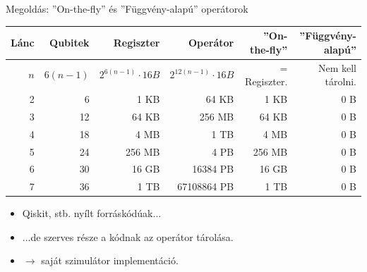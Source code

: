 \documentclass[aspectratio=169]{beamer}
\begin{document}
\begin{frame}[t]{Megoldás: ''On-the-fly'' és ''Függvény-alapú'' operátorok}
\vspace{2mm}
\begin{tabular}{r|r|r|r|r|r}
Lánc & Qubitek & Regiszter & Operátor &  \cellcolor{applegreen!30} ''On-the-fly'' &  \cellcolor{applegreen!30} ''Függvény-alapú'' \\
\hline
\rule{0pt}{1.05\normalbaselineskip} $n$ & $6(n-1)$ & $2^{6(n-1)} \cdot{} 16 B$ & ${2^{12(n-1)}} \cdot{} 16 B$ &  = Regiszter. &   Nem kell tárolni. \\
\hline
2 & 6 &  1 KB &  64 KB &  1 KB & 0 B \\
3 & 12 &  64 KB &  256 MB &  64 KB & 0 B \\
4 & 18 &  4 MB & \color{red} 1 TB &  4 MB & 0 B  \\
5 & 24 &  256 MB & \color{red} 4 PB &  256 MB & 0 B \\
6 & 30 &  16 GB & \color{red} 16384 PB &  16 GB & 0 B\\
7 & 36 & \color{red} 1 TB & \color{red} 67108864 PB & \color{red} 1 TB & 0 B
\end{tabular}
\pause
\vspace{2mm}
\begin{itemize}
    \item Qiskit, stb. nyílt forráskódúak...
    \item ...de szerves része a kódnak az operátor tárolása.
    \item $\rightarrow$ saját szimulátor implementáció.
\end{itemize}

\end{frame}
\end{document}
